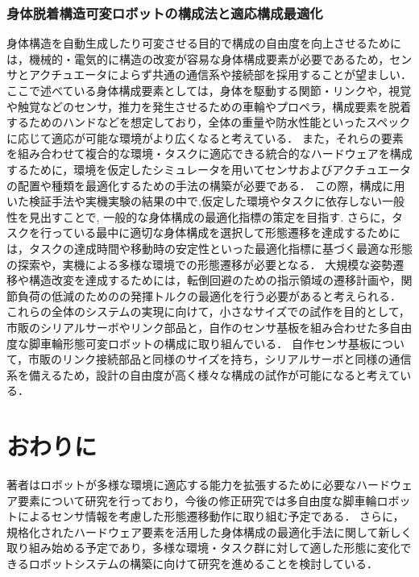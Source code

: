 \documentclass[twocolumn]{d-abst}
\begin{document}
\subsubsection{身体脱着構造可変ロボットの構成法と適応構成最適化}
身体構造を自動生成したり可変させる目的で構成の自由度を向上させるためには，機械的・電気的に構造の改変が容易な身体構成要素が必要であるため，センサとアクチュエータによらず共通の通信系や接続部を採用することが望ましい．
ここで述べている身体構成要素としては，身体を駆動する関節・リンクや，視覚や触覚などのセンサ，推力を発生させるための車輪やプロペラ，構成要素を脱着するためのハンドなどを想定しており，全体の重量や防水性能といったスペックに応じて適応が可能な環境がより広くなると考えている．
また，それらの要素を組み合わせて複合的な環境・タスクに適応できる統合的なハードウェアを構成するために，環境を仮定したシミュレータを用いてセンサおよびアクチュエータの配置や種類を最適化するための手法の構築が必要である．
この際，構成に用いた検証手法や実機実験の結果の中で,仮定した環境やタスクに依存しない一般性を見出すことで, 一般的な身体構成の最適化指標の策定を目指す.
さらに，タスクを行っている最中に適切な身体構成を選択して形態遷移を達成するためには，タスクの達成時間や移動時の安定性といった最適化指標に基づく最適な形態の探索や，実機による多様な環境での形態遷移が必要となる．
大規模な姿勢遷移や構造改変を達成するためには，転倒回避のための指示領域の遷移計画や，関節負荷の低減のためのの発揮トルクの最適化を行う必要があると考えられる．
これらの全体のシステムの実現に向けて，小さなサイズでの試作を目的として，市販のシリアルサーボやリンク部品と，自作のセンサ基板を組み合わせた多自由度な脚車輪形態可変ロボットの構成に取り組んでいる．
自作センサ基板について，市販のリンク接続部品と同様のサイズを持ち，シリアルサーボと同様の通信系を備えるため，設計の自由度が高く様々な構成の試作が可能になると考えている．

\section{おわりに}
著者はロボットが多様な環境に適応する能力を拡張するために必要なハードウェア要素について研究を行っており，今後の修正研究では多自由度な脚車輪ロボットによるセンサ情報を考慮した形態遷移動作に取り組む予定である．
さらに，規格化されたハードウェア要素を活用した身体構成の最適化手法に関して新しく取り組み始める予定であり，多様な環境・タスク群に対して適した形態に変化できるロボットシステムの構築に向けて研究を進めることを検討している．



\end{document}
